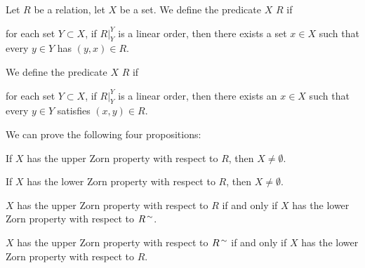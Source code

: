 \documentclass{article}
\begin{document}
\begin{definition}%
Let $R$ be a relation, let $X$ be a set.
We define the predicate $X$  $R$
if
\begin{defn}
\item for each set $Y\subset X$, if $R|^{Y}_{Y}$ is a linear order,
  then there exists a set $x\in X$ such that every $y\in Y$ has
  $(y,x)\in R$.
\end{defn}
We define the predicate $X$ 
$R$ if
\begin{defn}
\item for each set $Y\subset X$, if $R|^{Y}_{Y}$ is a linear order,
  then there exists an $x\in X$ such that every $y\in Y$ satisfies
  $(x,y)\in R$.
\end{defn}
\end{definition}

We can prove the following four propositions:
\begin{thm}
\item\label{orders1:49} If $X$ has the upper Zorn property with respect
  to $R$, then $X\neq\emptyset$.
\item\label{orders1:50} If $X$ has the lower Zorn property with respect
  to $R$, then $X\neq\emptyset$.
\item\label{orders1:51} $X$ has the upper Zorn property with respect to
  $R$ if and only if $X$ has the lower Zorn property with respect to
  $R^{\,\sim}$. 
\item\label{orders1:52} $X$ has the upper Zorn property with respect to
  $R^{\,\sim}$ if and only if $X$ has the lower Zorn property with respect to
  $R$. 
\end{thm}
\end{document}
